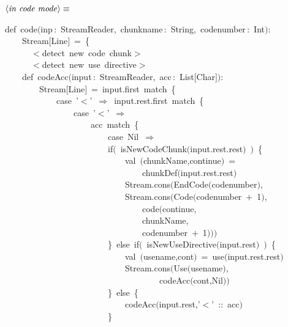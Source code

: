 \documentclass[a4paper,12pt]{article}
\begin{document}
$\left<\mbox{\emph{in code mode}}\right>\equiv$
\begin{program}{\vem def}~code$($inp\,{\rm :}~StreamReader,~chunkname\,{\rm :}~String,~codenumber\,{\rm :}~Int$)${\rm :}
\\~~~~Stream$[$Line$]$~=~{\small\{}
\\~~~~~~$<$detect~{\vem new}~code~chunk$>$
\\~~~~~~$<$detect~{\vem new}~use~directive$>$
\\~~~~{\vem def}~codeAcc$($input\,{\rm :}~StreamReader,~acc\,{\rm :}~List$[$Char$]$$)${\rm :}
\\~~~~~~~~Stream$[$Line$]$~=~input.first~{\vem match}~{\small\{}
\\~~~~~~~~~~~~{\vem case}~'$<$'~$\Rightarrow$~input.rest.first~{\vem match}~{\small\{}
\\~~~~~~~~~~~~~~~~{\vem case}~'$<$'~$\Rightarrow$
\\~~~~~~~~~~~~~~~~~~~~acc~{\vem match}~{\small\{}
\\~~~~~~~~~~~~~~~~~~~~~~~~{\vem case}~Nil~$\Rightarrow$
\\~~~~~~~~~~~~~~~~~~~~~~~~{\vem if}$($~isNewCodeChunk$($input.rest.rest$)$~$)$~{\small\{}
\\~~~~~~~~~~~~~~~~~~~~~~~~~~~~{\vem val}~$($chunkName,continue$)$~=
\\~~~~~~~~~~~~~~~~~~~~~~~~~~~~~~~~chunkDef$($input.rest.rest$)$
\\~~~~~~~~~~~~~~~~~~~~~~~~~~~~Stream.cons$($EndCode$($codenumber$)$,
\\~~~~~~~~~~~~~~~~~~~~~~~~~~~~Stream.cons$($Code$($codenumber~$+$~1$)$,
\\~~~~~~~~~~~~~~~~~~~~~~~~~~~~~~~~code$($continue,
\\~~~~~~~~~~~~~~~~~~~~~~~~~~~~~~~~chunkName,
\\~~~~~~~~~~~~~~~~~~~~~~~~~~~~~~~~codenumber~$+$~1$)$$)$$)$
\\~~~~~~~~~~~~~~~~~~~~~~~~{\small\}}~{\vem else}~{\vem if}$($~isNewUseDirective$($input.rest$)$~$)$~{\small\{}
\\~~~~~~~~~~~~~~~~~~~~~~~~~~~~{\vem val}~$($usename,cont$)$~=~use$($input.rest.rest$)$
\\~~~~~~~~~~~~~~~~~~~~~~~~~~~~Stream.cons$($Use$($usename$)$,
\\~~~~~~~~~~~~~~~~~~~~~~~~~~~~~~~~~~~~codeAcc$($cont,Nil$)$$)$
\\~~~~~~~~~~~~~~~~~~~~~~~~{\small\}}~{\vem else}~{\small\{}
\\~~~~~~~~~~~~~~~~~~~~~~~~~~~~codeAcc$($input.rest,'$<$'~{\rm :}{\rm :}~acc$)$
\\~~~~~~~~~~~~~~~~~~~~~~~~{\small\}}
\end{program}
\end{document}
